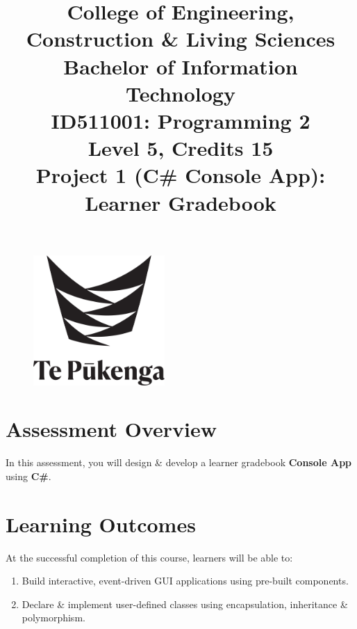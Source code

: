 \documentclass{article}
\author{}
\begin{document}
\begin{figure}
    \centering
    \includegraphics[width=50mm]{../../resources/img/logo.png}
\end{figure}

\title{College of Engineering, Construction \& Living Sciences\\Bachelor of Information Technology\\ID511001: Programming 2\\Level 5, Credits 15\\\textbf{Project 1 (C\# Console App): Learner Gradebook}}
\date{}
\maketitle

\section*{Assessment Overview}
In this assessment, you will design \& develop a learner gradebook \textbf{Console App} using \textbf{C\#}. 

\section*{Learning Outcomes}
At the successful completion of this course, learners will be able to:
\begin{enumerate}
    \item Build interactive, event-driven GUI applications using pre-built components.
    \item Declare \& implement user-defined classes using encapsulation, inheritance \& polymorphism.
\end{enumerate}
\end{document}

